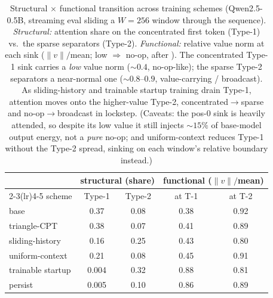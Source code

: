 \begin{table}[t]
\centering
\small
\setlength{\tabcolsep}{4pt}
\begin{tabular}{lcccc}
\toprule
 & \multicolumn{2}{c}{structural (share)} & \multicolumn{2}{c}{functional ($\|v\|/$mean)} \\
\cmidrule(lr){2-3}\cmidrule(lr){4-5}
scheme & Type-1 & Type-2 & at T-1 & at T-2 \\
\midrule
base             & 0.37  & 0.08 & 0.38 & 0.92 \\
triangle-CPT     & 0.38  & 0.07 & 0.41 & 0.89 \\
sliding-history         & 0.16  & 0.25 & 0.43 & 0.80 \\
uniform-context   & 0.21  & 0.08 & 0.45 & 0.91 \\
trainable startup          & 0.004 & 0.32 & 0.88 & 0.81 \\
persist          & 0.005 & 0.10 & 0.86 & 0.89 \\
\bottomrule
\end{tabular}
\caption{Structural $\times$ functional transition across training schemes (Qwen2.5-0.5B, streaming eval sliding a $W{=}256$ window through the sequence). \emph{Structural:} attention share on the concentrated first token (Type-1) vs.\ the sparse separators (Type-2). \emph{Functional:} relative value norm at each sink ($\|v\|/$mean; low $\Rightarrow$ no-op, after \citealp{fesser2026unifying}). The concentrated Type-1 sink carries a \emph{low} value norm ($\sim$$0.4$, no-op-like); the sparse Type-2 separators a near-normal one ($\sim$$0.8$--$0.9$, value-carrying / broadcast). As sliding-history and trainable startup training drain Type-1, attention moves onto the higher-value Type-2, concentrated$\to$sparse and no-op$\to$broadcast in lockstep. (Caveats: the pos-0 sink is heavily attended, so despite its low value it still injects $\sim$$15\%$ of base-model output energy, not a \emph{pure} no-op; and uniform-context reduces Type-1 without the Type-2 spread, sinking on each window's relative boundary instead.)}
\label{tab:transition}
\end{table}
